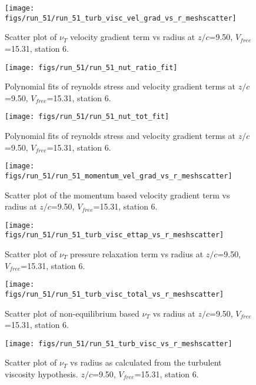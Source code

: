 \begin{figure}[H]
\centering
\texttt{[image: figs/run\_51/run\_51\_turb\_visc\_vel\_grad\_vs\_r\_meshscatter]}
\caption{Scatter plot of $\nu_T$ velocity gradient term vs radius at $z/c$=9.50, $V_{free}$=15.31, station 6.}
\end{figure}


\begin{figure}[H]
\centering
\texttt{[image: figs/run\_51/run\_51\_nut\_ratio\_fit]}
\caption{Polynomial fits of reynolds stress and velocity gradient terms at $z/c$=9.50, $V_{free}$=15.31, station 6.}
\end{figure}


\begin{figure}[H]
\centering
\texttt{[image: figs/run\_51/run\_51\_nut\_tot\_fit]}
\caption{Polynomial fits of reynolds stress and velocity gradient terms at $z/c$=9.50, $V_{free}$=15.31, station 6.}
\end{figure}


\begin{figure}[H]
\centering
\texttt{[image: figs/run\_51/run\_51\_momentum\_vel\_grad\_vs\_r\_meshscatter]}
\caption{Scatter plot of the momentum based velocity gradient term vs radius at $z/c$=9.50, $V_{free}$=15.31, station 6.}
\end{figure}


\begin{figure}[H]
\centering
\texttt{[image: figs/run\_51/run\_51\_turb\_visc\_ettap\_vs\_r\_meshscatter]}
\caption{Scatter plot of $\nu_T$ pressure relaxation term vs radius at $z/c$=9.50, $V_{free}$=15.31, station 6.}
\end{figure}


\begin{figure}[H]
\centering
\texttt{[image: figs/run\_51/run\_51\_turb\_visc\_total\_vs\_r\_meshscatter]}
\caption{Scatter plot of non-equilibrium based $\nu_T$ vs radius at $z/c$=9.50, $V_{free}$=15.31, station 6.}
\end{figure}


\begin{figure}[H]
\centering
\texttt{[image: figs/run\_51/run\_51\_turb\_visc\_vs\_r\_meshscatter]}
\caption{Scatter plot of $\nu_T$ vs radius as calculated from the turbulent viscosity hypothesis. $z/c$=9.50, $V_{free}$=15.31, station 6.}
\end{figure}



